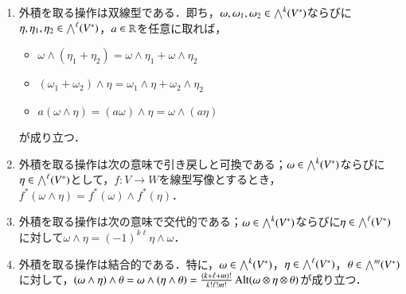 \begin{prop}[外積の基本性質]
\leavevmode
\begin{enumerate}
\item 外積を取る操作は双線型である．即ち，$\omega, \omega_1, \omega_2 \in \bigwedge^k(V^*)$ならびに$\eta, \eta_1, \eta_2 \in \bigwedge^\ell(V^*)$，$a \in \mathbb{R}$を任意に取れば，
\begin{itemize}
\item $\omega \wedge (\eta_1 + \eta_2) = \omega \wedge \eta_1 + \omega \wedge \eta_2$
\item $(\omega_1 + \omega_2) \wedge \eta = \omega_1 \wedge \eta + \omega_2 \wedge \eta_2$
\item $a(\omega \wedge \eta) = (a\omega) \wedge \eta = \omega \wedge (a \eta)$
\end{itemize}が成り立つ．
\item 外積を取る操作は次の意味で引き戻しと可換である；$\omega \in \bigwedge^k(V^*)$ならびに$\eta \in \bigwedge^\ell(V^*)$として，$f \colon V \to W$を線型写像とするとき，$f^*(\omega \wedge \eta) = f^*(\omega) \wedge f^*(\eta)$．
\item 外積を取る操作は次の意味で交代的である；$\omega \in \bigwedge^k(V^*)$ならびに$\eta \in \bigwedge^\ell(V^*)$に対して$\omega \wedge \eta = (-1)^{k\ell}\eta \wedge \omega$．
\item 外積を取る操作は結合的である．特に，$\omega \in \bigwedge^k(V^*)$，$\eta \in \bigwedge^{\ell}(V^*)$，$\theta \in \bigwedge^m(V^*)$に対して，$(\omega \wedge \eta) \wedge \theta = \omega \wedge(\eta \wedge \theta) = \frac{(k+\ell+m)!}{k! \ell! m!} \operatorname{Alt}(\omega \otimes \eta \otimes \theta)$が成り立つ．
\end{enumerate}
\end{prop}

